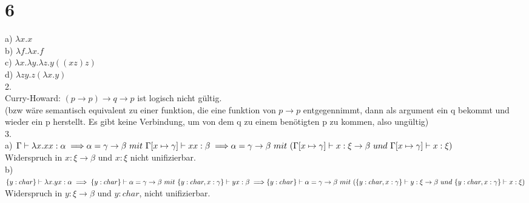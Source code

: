 \documentclass{article}
\begin{document}
	\section{6}
	a) $\lambda x.x$\\
	b) $\lambda f.\lambda x. f$\\
	c) $\lambda x.\lambda y. \lambda z. y ((x z) z)$\\
	d) $\lambda z y.z(\lambda x.y)$\\
	2.\\
	Curry-Howard: $(p\to p) \to q\to p$ ist logisch nicht gültig.\\
	(bzw wäre semantisch equivalent zu einer funktion, die eine funktion von $p\to p$ entgegennimmt, dann als argument ein q bekommt und wieder ein p herstellt. Es gibt keine Verbindung, um von dem q zu einem benötigten p zu kommen, also ungültig)\\
	3.\\
	a) $\Gamma\vdash \lambda x.xx:\alpha \implies\\ \alpha=\gamma\to \beta\ mit\ \Gamma[x\mapsto \gamma]\vdash xx:\beta\implies\\ \alpha=\gamma\to \beta\ mit\ (\Gamma[x\mapsto \gamma]\vdash x:\xi\to\beta\ und\ \Gamma[x\mapsto \gamma]\vdash x:\xi)$\\
	Widerspruch in $x:\xi\to\beta$ und $x:\xi$ nicht unifizierbar.\\
	b) $\{y:char\}\vdash \lambda x.yx:\alpha \implies \{y:char\}\vdash \alpha=\gamma\to\beta\ mit \ \{y:char,x:\gamma\}\vdash yx:\beta \implies\\
	\{y:char\}\vdash \alpha=\gamma\to\beta\ mit \ (\{y:char,x:\gamma\}\vdash y:\xi\to\beta\ und\ \{y:char,x:\gamma\}\vdash x:\xi )$\\
	Widerspruch in $y:\xi\to\beta$ und $y:char$, nicht unifizierbar.\\
\end{document}

